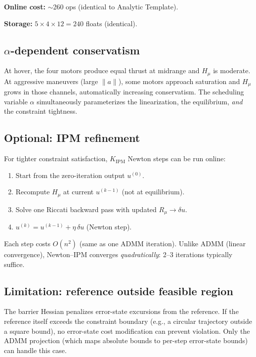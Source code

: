 \documentclass[11pt]{article}
\begin{document}
\textbf{Online cost:} $\sim$260 ops (identical to Analytic Template).

\textbf{Storage:} $5 \times 4 \times 12 = 240$ floats (identical).

\subsection{$\alpha$-dependent conservatism}

At hover, the four motors produce equal thrust at midrange
and $H_\mu$ is moderate.
At aggressive maneuvers (large $\|a\|$), some motors
approach saturation and $H_\mu$ grows in those channels,
automatically increasing conservatism.
The scheduling variable $\alpha$ simultaneously parameterizes
the linearization, the equilibrium, \emph{and} the
constraint tightness.

\subsection{Optional: IPM refinement}

For tighter constraint satisfaction,
$K_{\mathrm{IPM}}$ Newton steps can be run online:
\begin{enumerate}[leftmargin=6mm]
  \item Start from the zero-iteration output $u^{(0)}$.
  \item Recompute $H_\mu$ at current $u^{(k-1)}$
    (not at equilibrium).
  \item Solve one Riccati backward pass with updated
    $R_\mu \to \delta u$.
  \item $u^{(k)} = u^{(k-1)} + \eta\, \delta u$
    (Newton step).
\end{enumerate}
Each step costs $O(n^2)$ (same as one ADMM iteration).
Unlike ADMM (linear convergence), Newton--IPM converges
\emph{quadratically}: 2--3 iterations typically suffice.

\subsection{Limitation: reference outside feasible region}

The barrier Hessian penalizes error-state excursions
from the reference. If the reference itself exceeds
the constraint boundary
(e.g., a circular trajectory outside a square bound),
no error-state cost modification can prevent violation.
Only the ADMM projection (which maps absolute bounds
to per-step error-state bounds) can handle this case.
\end{document}
